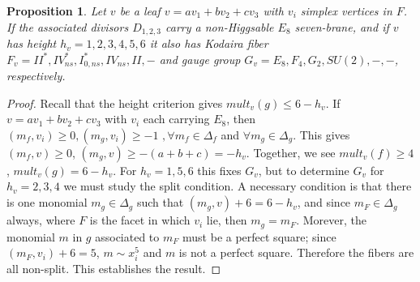 \documentclass[aps,prl,twocolumn, superscriptaddress,groupedaddress,nofootinbib]{revtex4-1}
\newtheorem{prop}{Proposition}
\begin{document}
\begin{prop}
\label{prop:E8roots}
Let $v$ be a leaf $v=av_1 + bv_2 + cv_3$ with $v_i$ simplex vertices in $F$. If the associated divisors $D_{1,2,3}$
carry a non-Higgsable $E_8$ seven-brane, and if $v$ has height
 $h_v=1,2,3,4,5,6$ it also has Kodaira fiber $F_v=II^*,IV^*_{ns},I^*_{0,ns},IV_{ns},II,-$
and gauge group $G_v=E_8,F_4,G_2,SU(2),-,-$, respectively.
\end{prop}
\begin{proof}
Recall that the height criterion
gives $mult_v(g)\leq 6-h_v$. If $v=av_1+bv_2+cv_3$ with $v_i$ each carrying $E_8$,
then 
$(m_f,v_i)\geq 0, (m_g,v_i)\geq -1\,\,, \forall m_f\in \Delta_f 
$ and $\forall m_g\in \Delta_g$.
This gives $(m_f,v)\geq 0$, $(m_g,v)\geq-(a+b+c)= -h_v$. Together, we see
$mult_v(f)\geq 4$, $mult_v(g)=6-h_v$. For $h_v= 1,5,6$ this fixes $G_v$, but 
to determine $G_v$ for $h_v=2,3,4$ we must study the split condition. A necessary
condition is that there is one monomial $m_g\in \Delta_g$ such that $(m_g,v)+6=6-h_v$,
and since $m_F \in \Delta_g$ always, where $F$ is the facet in which $v_i$ lie,
then $m_g=m_F$. Morever, the monomial $m$ in $g$ associated to $m_F$ must be a perfect
square; since $(m_F,v_i)+6=5$, $m\sim x_i^5$ and $m$ is not a perfect square. 
Therefore the fibers are all non-split. This establishes the result.
\end{proof}
\end{document}
